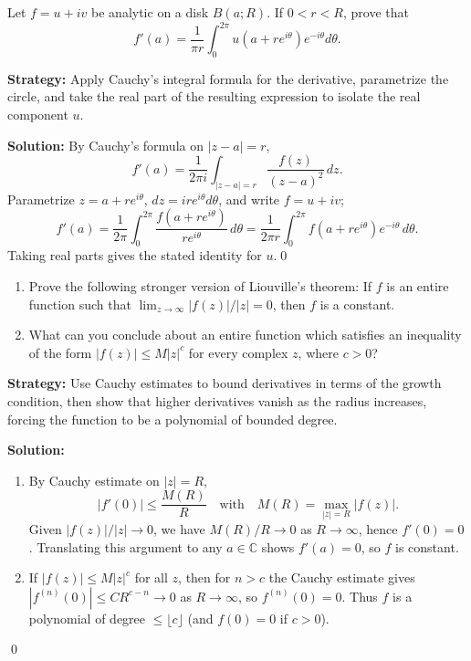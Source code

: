 \begin{problembox}
\begin{problemstatement}
Let \( f = u + iv \) be analytic on a disk \( B(a; R) \). If \( 0 < r < R \), prove that
\[f'(a) = \frac{1}{\pi r} \int_0^{2\pi} u(a + re^{i\theta}) e^{-i\theta} d\theta.\]
\end{problemstatement}
\end{problembox}

\noindent\textbf{Strategy:} Apply Cauchy's integral formula for the derivative, parametrize the circle, and take the real part of the resulting expression to isolate the real component \( u \).

\bigskip\noindent\textbf{Solution:}
By Cauchy's formula on $|z-a|=r$,
\[f'(a)=\frac{1}{2\pi i}\int_{|z-a|=r} \frac{f(z)}{(z-a)^2}\,dz.\]
Parametrize $z=a+re^{i\theta}$, $dz=ire^{i\theta}d\theta$, and write $f=u+iv$;
\[f'(a)=\frac{1}{2\pi}\int_0^{2\pi} \frac{f(a+re^{i\theta})}{re^{i\theta}}\,d\theta=\frac{1}{2\pi r}\int_0^{2\pi} f(a+re^{i\theta})e^{-i\theta}\,d\theta.\]
Taking real parts gives the stated identity for $u$.\qed


\begin{problembox}
\begin{problemstatement}
\begin{enumerate}[label=(\alph*)]
\item Prove the following stronger version of Liouville's theorem: If \( f \) is an entire function such that \( \lim_{z \to \infty} |f(z)|/|z| = 0 \), then \( f \) is a constant.
\item What can you conclude about an entire function which satisfies an inequality of the form \( |f(z)| \leq M|z|^c \) for every complex \( z \), where \( c > 0 \)?
\end{enumerate}
\end{problemstatement}
\end{problembox}

\noindent\textbf{Strategy:} Use Cauchy estimates to bound derivatives in terms of the growth condition, then show that higher derivatives vanish as the radius increases, forcing the function to be a polynomial of bounded degree.

\bigskip\noindent\textbf{Solution:}
\begin{enumerate}[label=(\alph*)]
\item By Cauchy estimate on $|z|=R$,
\[|f'(0)|\le \frac{M(R)}{R} \quad\text{with}\quad M(R)=\max_{|z|=R}|f(z)|.\]
Given $|f(z)|/|z|\to0$, we have $M(R)/R\to0$ as $R\to\infty$, hence $f'(0)=0$. Translating this argument to any $a\in\mathbb C$ shows $f'(a)=0$, so $f$ is constant.
\item If $|f(z)|\le M|z|^c$ for all $z$, then for $n>c$ the Cauchy estimate gives $|f^{(n)}(0)|\le C R^{c-n}\to0$ as $R\to\infty$, so $f^{(n)}(0)=0$. Thus $f$ is a polynomial of degree $\le \lfloor c\rfloor$ (and $f(0)=0$ if $c>0$).
\end{enumerate}\qed
